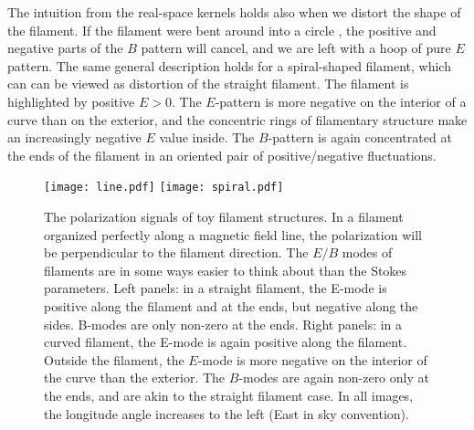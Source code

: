 The intuition from the real-space kernels holds also when we distort the shape of the filament.  If the filament were bent around into a circle , the positive and negative parts of the $B$ pattern will cancel, and we are left with a hoop of pure $E$ pattern.  The same general description holds for a spiral-shaped filament, which can can be viewed as distortion of the straight filament.  The filament is highlighted by positive $E>0$.  The $E$-pattern is more negative on the interior of a curve than on the exterior, and the concentric rings of filamentary structure make an increasingly negative $E$ value inside.  The $B$-pattern is again concentrated at the ends of the filament in an oriented pair of positive/negative fluctuations.
 
 
\begin{figure}
  \texttt{[image: line.pdf]}
  \texttt{[image: spiral.pdf]}
  \caption{
    The polarization signals of toy filament structures.
    In a filament organized perfectly along a magnetic field line, the polarization will be perpendicular to the filament direction.  The $E/B$ modes of filaments are in some ways easier to think about than the Stokes parameters.
    Left panels: in a straight filament, the E-mode is positive along the filament and at the ends, but negative along the sides.  B-modes are only non-zero at the ends.  Right panels: in a curved filament, the E-mode is again positive along the filament.  Outside the filament, the $E$-mode is more negative on the interior of the curve than the exterior.  The $B$-modes are again non-zero only at the ends, and are akin to the straight filament case.
    In all images, the longitude angle increases to the left (East in sky convention).}
  \label{fig:polfilaments}
\end{figure}




 


